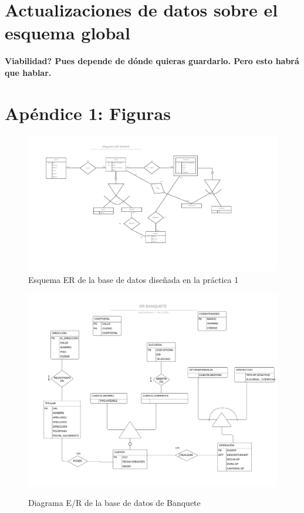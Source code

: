 \documentclass{article}
\begin{document}
\section{Actualizaciones de datos sobre el esquema global}

\textbf{Viabilidad? Pues depende de dónde quieras guardarlo. Pero esto habrá que hablar.}

\newpage
\section{Apéndice 1: Figuras}

\begin{landscape}
\begin{figure}
\centering
\includegraphics[scale=0.75]{images/er_practica1.png}
\caption{Esquema ER de la base de datos diseñada en la práctica 1}
\label{fig:er1}
\end{figure}
\end{landscape}


\begin{landscape}
\begin{figure}
\centering
\includegraphics[scale=0.75]{images/ER_BANQUETE.jpeg}
\label{fig:er_banquete}
\caption{Diagrama E/R de la base de datos de Banquete}
\end{figure}
\end{landscape}
\end{document}
